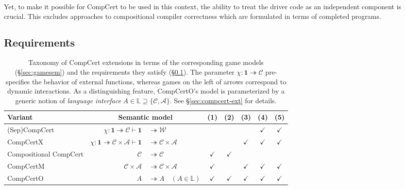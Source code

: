 \documentclass[11pt,oneside]{book}
\theoremstyle{definition}
\begin{document}
Yet,
to make it possible for CompCert to be used in this context,
the ability to treat the driver code as an
independent component is crucial.
This excludes approaches to
compositional compiler correctness
which are formulated in terms of completed programs.


\subsection{Requirements} \label{sec:compcertreq} %

\begin{table} %
  \small
  \centering
  \begin{tabular}{lr@{}lc@{\:}c@{\:}c@{\:}c@{\:}c}
    \hline
    Variant & \multicolumn{2}{c}{Semantic model} & (1) & (2) & (3) & (4) & (5) \\
    \hline
    (Sep)CompCert \citep{compcert,sepcompcert} &
      $\chi : \mathbf{1} \twoheadrightarrow \mathcal{C}
      \vdash \mathbf{1} $ & ${} \twoheadrightarrow \mathcal{W}$ &
      & & & $\checkmark$ & $\checkmark$ \\
    CompCertX \citep{popl15} &
      \hspace{-1ex}
      $\chi : \mathbf{1} \twoheadrightarrow \mathcal{C} \times \mathcal{A}
       \vdash
       \mathbf{1} $ & ${} \twoheadrightarrow \mathcal{C} \times \mathcal{A}$
      & & & $\checkmark$ & $\checkmark$ & $\checkmark$ \\
    Compositional CompCert \citep{compcompcert} &
      $\mathcal{C}$ & ${} \twoheadrightarrow \mathcal{C}$ &
      $\checkmark$ & $\checkmark$ & & & \\
    CompCertM \citep{compcertm} &
      $\mathcal{C} \times \mathcal{A} $ & ${}\twoheadrightarrow
       \mathcal{C} \times \mathcal{A}$ &
      $\checkmark$ & & $\checkmark$ & $\checkmark$ & $\checkmark$ \\
    CompCertO &
      $A $ & ${}\twoheadrightarrow A \quad
      (A \in \mathbb{L})$ &
      $\checkmark$&$\checkmark$&$\checkmark$&$\checkmark$&$\checkmark$ \\
    \hline
  \end{tabular}
  \caption[Taxonomy of CompCert extensions]%
   {Taxonomy of CompCert extensions
    in terms of the corresponding game models (\S\ref{sec:gamesem})
    and the requirements they satisfy (\S\ref{sec:compcertreq}).
    The parameter $\chi : \mathbf{1} \twoheadrightarrow \mathcal{C}$
    pre-specifies the behavior of external functions,
    whereas games on the left of arrows
    correspond to dynamic interactions.
    As a distinguishing feature,
    CompCertO's model is parameterized by a generic notion of
    \emph{language interface}
    $A \in \mathbb{L} \supseteq \{\mathcal{C}, \mathcal{A}\}$.
    See \S\ref{sec:compcert-ext} for details.
  }
  \label{tbl:compcerts}
\end{table}
\end{document}
